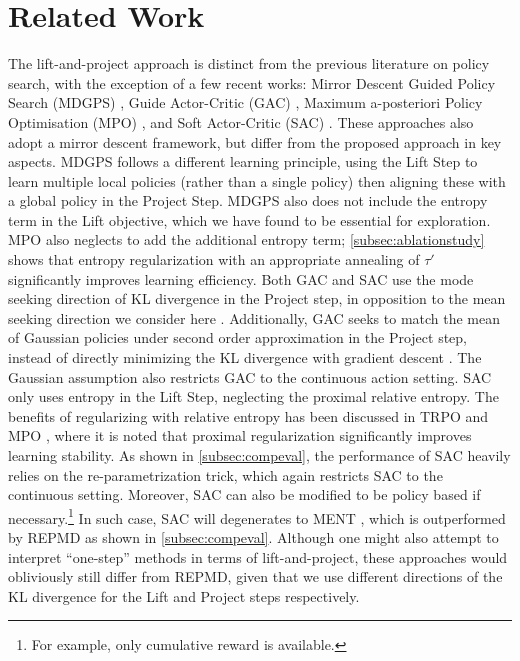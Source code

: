 
\section{Related Work}
\label{sec:related_work}

The lift-and-project approach is distinct from the previous literature on policy
search, with the exception of a few recent works:
Mirror Descent Guided Policy Search (MDGPS) \citep{montgomery2016guided},
Guide Actor-Critic (GAC) \citep{tangkaratt2017guide},
Maximum a-posteriori Policy Optimisation (MPO) \citep{abdolmaleki2018maximum},
and Soft Actor-Critic (SAC) \citep{haarnoja2018soft}.
These approaches also adopt a mirror descent framework,
but differ from the proposed approach in key aspects.
%
MDGPS \citep{montgomery2016guided} follows a different learning principle,
using the Lift Step to learn multiple local policies 
(rather than a single policy)
then aligning these with a global policy in the Project Step.
MDGPS also does not include the entropy term in the Lift objective,
which we have found to be essential for exploration. 
%
MPO \citep{abdolmaleki2018maximum} also neglects to add the additional entropy 
term;
\cref{subsec:ablationstudy} shows that entropy regularization with an
appropriate annealing of $\tau'$ significantly improves learning efficiency.
%
Both GAC and SAC use the mode seeking direction of KL divergence in
the Project step, in opposition to the mean seeking direction
we consider here \citep{tangkaratt2017guide,haarnoja2018soft}. 
Additionally, 
GAC seeks to match the mean of Gaussian policies under second order approximation in the Project step,
instead of directly minimizing the KL divergence with gradient descent \citep{tangkaratt2017guide}.
The Gaussian assumption also restricts GAC to the continuous action setting.
SAC only uses entropy in the Lift Step, neglecting the proximal relative entropy.
The benefits of regularizing with relative entropy has been discussed in TRPO \citep{schulman2015trust} and MPO \citep{abdolmaleki2018maximum},
where it is noted that proximal regularization
significantly improves learning stability.
As shown in \cref{subsec:compeval}, the performance of SAC heavily relies on the re-parametrization trick, which again restricts SAC to the continuous setting.
Moreover, 
SAC can also be modified to be policy based if necessary.\footnote{For example, only cumulative reward is available.}
In such case, SAC will degenerates to MENT \citep{levine2018reinforcement}, which is outperformed by REPMD as shown in \cref{subsec:compeval}.
Although one might also attempt to interpret ``one-step'' methods
in terms of lift-and-project,
these approaches would obliviously still differ from REPMD,
given that we use different directions of the KL divergence
for the Lift and Project steps respectively. 

